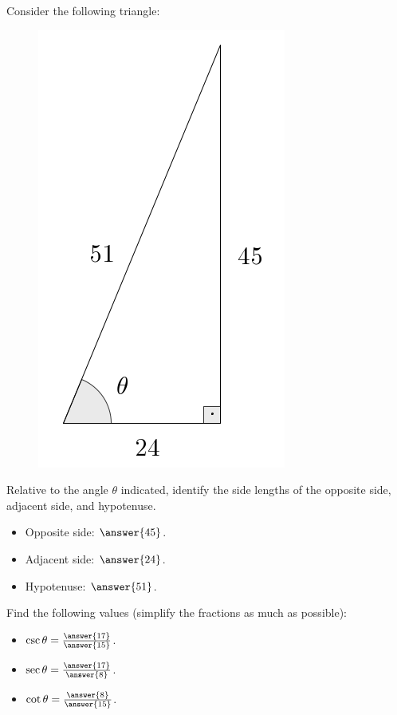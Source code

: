\documentclass{ximera}
\author{Ivo Terek}
\begin{document}
\begin{exercise}
  Consider the following triangle:

  \begin{figure}[h]
    \centering
    \includegraphics[scale=.3]{RTT7-fig.png}
  \end{figure}

  Relative to the angle $\theta$ indicated, identify the side lengths of the opposite side, adjacent side, and hypotenuse.

  \begin{itemize}
  \item Opposite side: $\answer{45}$.
  \item Adjacent side: $\answer{24}$.
  \item Hypotenuse: $\answer{51}$.
  \end{itemize}

  \begin{exercise}
    Find the following values (simplify the fractions as much as possible):
    \begin{itemize}
    \item $\csc\theta = \frac{\answer{17}}{\answer{15}}$.
    \item $\sec\theta = \frac{\answer{17}}{\answer{8}}$.
    \item $\cot\theta = \frac{\answer{8}}{\answer{15}}$.
    \end{itemize}
  \end{exercise}

\end{exercise}
\end{document}

